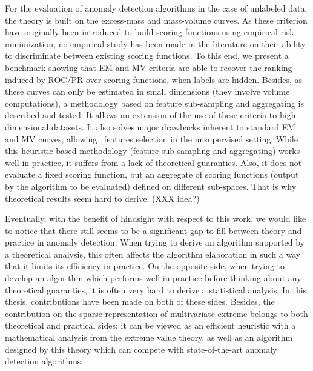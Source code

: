 For the evaluation of anomaly detection algorithms in the case of unlabeled data, the theory is built on the excess-mass and mass-volume curves.
%
As these criterion have originally been introduced to build scoring functions using empirical risk minimization, no empirical study has been made in the literature on their ability to discriminate between existing scoring functions. %
To this end, we present a benchmark showing that EM and MV criteria are able to recover the ranking induced by ROC/PR over scoring functions, when labels are hidden.
Besides, as these curves can only be estimated in small dimensions (they involve volume computations), a methodology based on feature sub-sampling and aggregating is described and tested. It allows an extension of the use of these criteria to high-dimensional datasets. It also solves major drawbacks inherent to standard EM and MV curves, allowing \eg~features selection in the unsupervised setting.
%
While this heuristic-based methodology (feature sub-sampling and aggregating) works well in practice, it suffers from a lack of theoretical guaranties. Also, it does not evaluate a fixed scoring function, but an aggregate of scoring functions (output by the algorithm to be evaluated) defined on different sub-spaces. That is why theoretical results seem hard to derive.  (XXX idea?)


Eventually, with the benefit of hindsight with respect to this work, we would like to notice that there still seems to be a significant gap to fill between theory and practice in anomaly detection. When trying to derive an algorithm supported by a theoretical analysis, this often affects the algorithm elaboration in such a way that it limits its efficiency in practice.
On the opposite side, when trying to develop an algorithm which performs well in practice before thinking about any theoretical guaranties, it is often very hard to derive a statistical analysis. In this thesis, contributions have been made on both of these sides. Besides, the contribution on the sparse representation of multivariate extreme belongs to both theoretical and practical sides: it can be viewed as an efficient heuristic with a mathematical analysis from the extreme value theory, as well as an algorithm designed by this theory which can compete with state-of-the-art anomaly detection algorithms.



